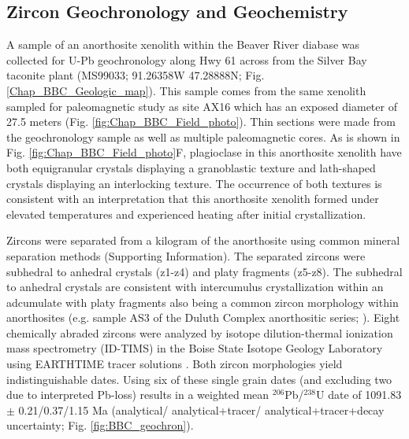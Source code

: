 \subsection{Zircon Geochronology and Geochemistry}

A sample of an anorthosite xenolith within the Beaver River diabase was collected for U-Pb geochronology along Hwy 61 across from the Silver Bay taconite plant (MS99033; 91.26358\textdegree W 47.28888\textdegree N; Fig. \ref{Chap_BBC_Geologic_map}). This sample comes from the same xenolith sampled for paleomagnetic study as site AX16 which has an exposed diameter of 27.5 meters (Fig. \ref{fig:Chap_BBC_Field_photo}). Thin sections were made from the geochronology sample as well as multiple paleomagnetic cores. As is shown in Fig. \ref{fig:Chap_BBC_Field_photo}F, plagioclase in this anorthosite xenolith have both equigranular crystals displaying a granoblastic texture and lath-shaped crystals displaying an interlocking texture. The occurrence of both textures is consistent with an interpretation that this anorthosite xenolith formed under elevated temperatures and experienced heating after initial crystallization. 

Zircons were separated from a kilogram of the anorthosite using common mineral separation methods (Supporting Information). The separated zircons were subhedral to anhedral crystals (z1-z4) and platy fragments (z5-z8). The subhedral to anhedral crystals are consistent with intercumulus crystallization within an adcumulate with platy fragments also being a common zircon morphology within anorthosites (e.g. sample AS3 of the Duluth Complex anorthositic series; \cite{Schmitz2003a}). Eight chemically abraded zircons were analyzed by isotope dilution-thermal ionization mass spectrometry (ID-TIMS) in the Boise State Isotope Geology Laboratory using EARTHTIME tracer solutions \citep{Condon2015a}. Both zircon morphologies yield indistinguishable dates. Using six of these single grain dates (and excluding two due to interpreted Pb-loss) results in a weighted mean $^{206}$Pb/$^{238}$U date of 1091.83 $\pm$ 0.21/0.37/1.15 Ma (analytical/ analytical+tracer/ analytical+tracer+decay uncertainty; Fig. \ref{fig:BBC_geochron}). 


